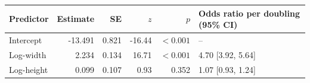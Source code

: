 \begin{tabular}{lrrrrl}
\toprule
Predictor & Estimate & SE & $z$ & $p$ & Odds ratio per doubling (95\% CI)
\\
\midrule
Intercept & -13.491 & 0.821 & -16.44 & $<0.001$ & --
\\
Log-width & 2.234 & 0.134 & 16.71 & $<0.001$ & 4.70 [3.92, 5.64]
\\
Log-height & 0.099 & 0.107 & 0.93 & 0.352 & 1.07 [0.93, 1.24]
\\
\bottomrule
\end{tabular}
